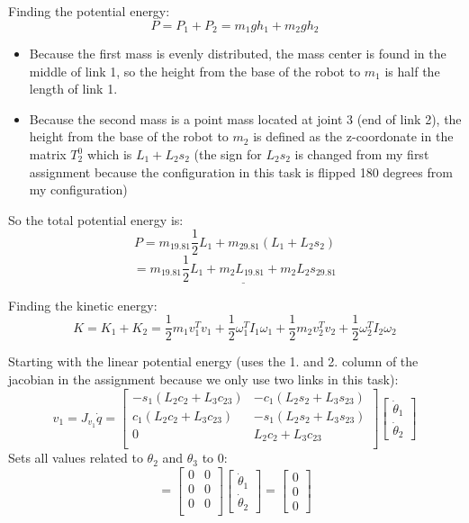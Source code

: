 \documentclass[12pt,norsk,a4paper]{article}
\begin{document}
    Finding the potential energy:\\
    \[P = P_1 + P_2 = m_1gh_1 + m_2gh_2\]
    \begin{itemize}
        \item Because the first mass is evenly distributed, the mass center is found in the middle of link 1, 
                so the height from the base of the robot to $m_1$ is half the length of link 1.
        \item Because the second mass is a point mass located at joint 3 (end of link 2), 
                the height from the base of the robot to $m_2$ is defined as the z-coordonate in the matrix $T_2^0$
                which is $L_1+L_2s_2$ (the sign for $L_2s_2$ is changed from my first assignment because the configuration in this task is flipped 180 degrees from my configuration)
    \end{itemize}
    So the total potential energy is:
    \[P = m_19.81\frac{1}{2}L_1 + m_29.81(L_1+L_2s_2)\]
    \[= \underline{m_19.81\frac{1}{2}L_1+m_2L_19.81+m_2L_2s_29.81}\]

    Finding the kinetic energy:\\
    \[K = K_1+K_2 = \frac{1}{2}m_1v_1^Tv_1 + \frac{1}{2}\omega_1^TI_1\omega_1 + \frac{1}{2}m_2v_2^Tv_2 + \frac{1}{2}\omega_2^TI_2\omega_2\]
    
    Starting with the linear potential energy (uses the 1. and 2. column of the jacobian in the assignment because we only use two links in this task):\\
    \[v_1 = J_{v_1}\dot q = 
    \left[\begin{array}{cc}
        -s_1(L_2c_2+L_3c_{23}) & -c_1(L_2s_2+L_3s_{23})\\
        c_1(L_2c_2+L_3c_{23}) & -s_1(L_2s_2+L_3s_{23})\\
        0 & L_2c_2+L_3c_{23}\\
    \end{array}\right]
    \left[\begin{array}{c}
        \dot\theta_1 \\ \dot\theta_2
    \end{array}\right]\]
    Sets all values related to $\theta_2$ and $\theta_3$ to 0:\\
    \[=\left[\begin{array}{cc}
        0 & 0\\
        0 & 0\\
        0 & 0\\
    \end{array}\right]
    \left[\begin{array}{c}
        \dot\theta_1 \\ \dot\theta_2
    \end{array}\right]
    = \left[\begin{array}{c}
        0 \\ 0 \\ 0
    \end{array}\right]\]
\end{document}
